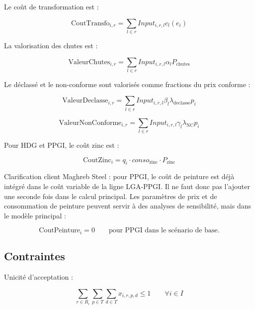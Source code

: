 \documentclass[12pt,a4paper]{article}
\begin{document}
Le coût de transformation est :

\begin{equation}
\text{CoutTransfo}_{i,r} =
\sum_{l\in r} Input_{i,r,l} c_l(e_i)
\end{equation}

La valorisation des chutes est :

\begin{equation}
\text{ValeurChutes}_{i,r} =
\sum_{l\in r} Input_{i,r,l}\alpha_l P_{\text{chutes}}
\end{equation}

Le déclassé et le non-conforme sont valorisés comme fractions du prix conforme :

\begin{equation}
\text{ValeurDeclasse}_{i,r} =
\sum_{l\in r} Input_{i,r,l}\beta_l \lambda_{\text{declasse}}p_i
\end{equation}

\begin{equation}
\text{ValeurNonConforme}_{i,r} =
\sum_{l\in r} Input_{i,r,l}\gamma_l \lambda_{\text{NC}}p_i
\end{equation}

Pour HDG et PPGI, le coût zinc est :

\begin{equation}
\text{CoutZinc}_i =
q_i \cdot conso_{\text{zinc}} \cdot P_{\text{zinc}}
\end{equation}

Clarification client Maghreb Steel : pour PPGI, le coût de peinture est déjà intégré dans le coût variable de la ligne LGA-PPGI. Il ne faut donc pas l'ajouter une seconde fois dans le calcul principal. Les paramètres de prix et de consommation de peinture peuvent servir à des analyses de sensibilité, mais dans le modèle principal :

\begin{equation}
\text{CoutPeinture}_i = 0
\qquad \text{pour PPGI dans le scénario de base.}
\end{equation}

\subsection{Contraintes}

Unicité d'acceptation :

\begin{equation}
\sum_{r\in R_i}\sum_{p\in T}\sum_{d\in T}
x_{i,r,p,d} \leq 1
\qquad \forall i\in I
\end{equation}
\end{document}
